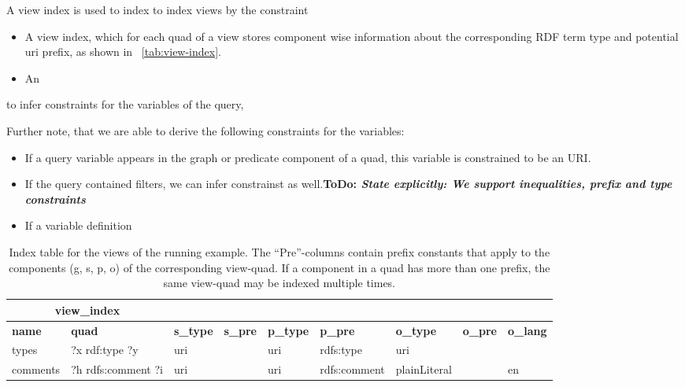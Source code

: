 \documentclass[a4paper,twoside,bibtotoc,abstracton,12pt,BCOR=15mm]{scrreprt}
\newcommand{\todo}[1]{\textbf{ToDo: \textit{#1}}}
\begin{document}
A view index is used to index to index views by the constraint


\begin{itemize}
  \item A view index, which for each quad of a view stores component wise information about the corresponding RDF term type and potential uri prefix,
as shown in ~\autoref{tab:view-index}.
  \item An 
\end{itemize}  

to infer constraints for the variables of the query, 

Further note, that we are able to derive the following constraints for the variables:
\begin{itemize}
  \item If a query variable appears in the graph or predicate component of a quad, this variable is constrained to be an URI.
  \item If the query contained filters, we can infer constrainst as well.\todo{State explicitly: We support inequalities, prefix and type constraints} %
  \item If a variable definition 
\end{itemize}


\begin{table}
\begin{scriptsize}
\begin{tabular}{|lllllllll|} \cline{1-2}
\multicolumn{2}{|c|}{view\_index} \\ \hline
\textbf{name} & \textbf{quad} & \textbf{s\_type} & \textbf{s\_pre} & \textbf{p\_type} & \textbf{p\_pre} & \textbf{o\_type} & \textbf{o\_pre} & \textbf{o\_lang} \\ \hline
types & ?x rdf:type ?y & uri & & uri & rdfs:type & uri & & \\
comments & ?h rdfs:comment ?i & uri & & uri & rdfs:comment & plainLiteral & & en \\
\bottomrule
\end{tabular}
\end{scriptsize}
\caption{Index table for the views of the running example. The ``Pre''-columns contain prefix constants that apply to the components (g, s, p, o) of the corresponding view-quad.
If a component in a quad has more than one prefix, the same view-quad may be indexed multiple times.}
\label{tab:view-index}
\end{table}
\end{document}

